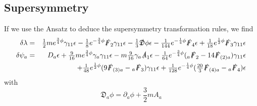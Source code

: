 \documentclass[a4paper,12pt]{article}
\newcommand{\ft}[2]{{\textstyle\frac{#1}{#2}}}
\begin{document}
\subsection{Supersymmetry}
If we use the Ansatz to deduce the supersymmetry transformation rules, we find \cite{Bergshoeff:2002nv}
\begin{eqnarray}
\delta \lambda&=& \ft12 m e^{\frac{3}{4} \phi} \gamma_{11} \epsilon-\ft18 e^{-\frac{3}{4} \phi} \slashed{F}_2
\gamma_{11} \epsilon-\ft13 \slashed{\mathfrak{D}} \phi
\epsilon-\ft{1}{144} e^{-\frac{1}{4} \phi} \slashed{F}_4 \epsilon+\ft{1}{18} e^{\frac{1}{2} \phi}
\slashed{F}_3 \gamma_{11} \epsilon \nonumber\\
\delta \psi_a&=&D_a \epsilon+\ft{9}{16}m e^{\frac{3}{4} \phi} \gamma_a \gamma_{11}
\epsilon-m\ft{9}{16} \gamma_a \slashed{A}_1\epsilon-\ft{1}{64} e^{-\frac{3}{4} \phi}({}_a \slashed{F}_2-14
\slashed{F}_{(2)a})\gamma_{11} \epsilon \nonumber\\&&+\ft{1}{48} e^{\frac{1}{2} \phi}(9\slashed{F}_{(3)a}-{}_a
\slashed{F}_3) \gamma_{11} \epsilon+\ft{1}{128} e^{-\frac{1}{4} \phi}(\ft{20}{3} \slashed{F}_{(4)a}-{}_a
\slashed{F}_4)\epsilon
\end{eqnarray}
with
\begin{equation}
\mathfrak{D}_a \phi=\partial_a \phi+\ft32 m A_a
\end{equation}
\end{document}

